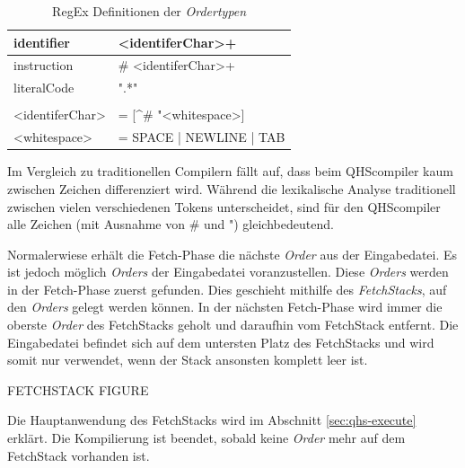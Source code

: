 \begin{table}[h]
    \centering
    \caption{RegEx Definitionen der \textit{Ordertypen}}
    \vspace{3mm} %
    
    \begin{tabular}{l>{\listingFont\selectfont}l}
    \multicolumn{1}{l|}{identifier}        & \textless{}identiferChar\textgreater{}+                           \\ \hline
    \multicolumn{1}{l|}{instruction}       & \# \textless{}identiferChar\textgreater{}+                        \\ \hline
    \multicolumn{1}{l|}{literalCode}       & ".*"                                                              \\
                                           &                                                                   \\
    \textless{}identiferChar\textgreater{} & = {[}\textasciicircum{}\# "\textless{}whitespace\textgreater{}{]} \\
    \textless{}whitespace\textgreater{}    & = SPACE | NEWLINE | TAB
    
    \end{tabular}
\end{table}

Im Vergleich zu traditionellen Compilern fällt auf, dass beim QHScompiler kaum zwischen Zeichen differenziert wird. Während die lexikalische Analyse traditionell zwischen vielen verschiedenen Tokens unterscheidet,
sind für den QHScompiler alle Zeichen (mit Ausnahme von \# und ") gleichbedeutend.

Normalerwiese erhält die Fetch-Phase die nächste \textit{Order} aus der Eingabedatei. 
Es ist jedoch möglich \textit{Orders} der Eingabedatei voranzustellen. Diese \textit{Orders} werden in der Fetch-Phase zuerst gefunden. Dies geschieht mithilfe des \textit{FetchStacks}, auf den \textit{Orders} gelegt werden können.
In der nächsten Fetch-Phase wird immer die oberste \textit{Order} des FetchStacks geholt und daraufhin vom FetchStack entfernt.
Die Eingabedatei befindet sich auf dem untersten Platz des FetchStacks und wird somit nur verwendet, wenn der Stack ansonsten komplett leer ist.

FETCHSTACK FIGURE

%
%
Die Hauptanwendung des FetchStacks wird im Abschnitt \ref{sec:qhs-execute} erklärt.
Die Kompilierung ist beendet, sobald keine \textit{Order} mehr auf dem FetchStack vorhanden ist.


